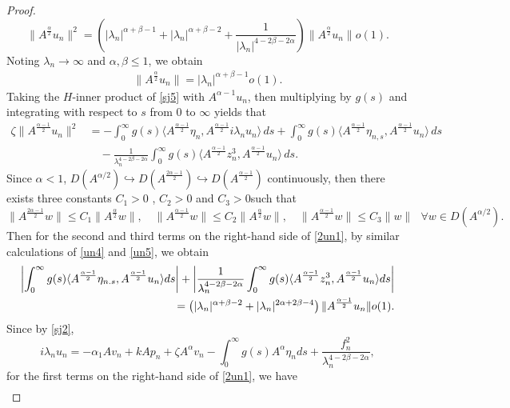 \documentclass[10pt,a4paper]{amsart}
\begin{document}
\begin{proof}
\[\|A^{\frac{\alpha}{2}}u_n\|^2=\left( |\lambda_n|^{\alpha + \beta - 1} +|\lambda_n|^{\alpha+\beta-2} +\frac{1}{|\lambda_n|^{4-2\beta-2\alpha}}\right)\| A^{\frac{\alpha}{2}} u_n \| o(1).\]
Noting $\lambda_n\to\infty$ and $\alpha,\beta\le1$, we obtain
		\begin{align}\label{un6}
			\| A^{\frac{\alpha}{2}} u_n \| = |\lambda_n|^{\alpha + \beta - 1} o(1).
		\end{align}
	Taking the $H$-inner product of \eqref{sj5} with $A^{\alpha-1}u_n$, then multiplying by $g(s)$ and integrating with respect to $s$ from $0$ to $\infty$ yields that
		\begin{align}\label{2un1}
			\zeta \| A^{\frac{\alpha-1}{2}} u_n \|^2
			&= -\int_0^\infty  g(s) \langle A^{\frac{\alpha-1}{2}} \eta_n, A^{\frac{\alpha-1}{2}}i \lambda_n u_n \rangle \, ds
			+ \int_0^\infty g(s) \langle A^{\frac{\alpha-1}{2}} \eta_{n,s}, A^{\frac{\alpha-1}{2}} u_n \rangle \, ds \nonumber \\
			&\quad - \frac{1}{\lambda_n^{4-2\beta-2\alpha}} \int_0^\infty g(s) \langle A^{\frac{\alpha-1}{2}} z_n^3, A^{\frac{\alpha-1}{2}} u_n \rangle \, ds.
		\end{align}
Since $\alpha<1$, $ D(A^{{\alpha}/{2}})\hookrightarrow D(A^{\frac{2\alpha-1}{2}})\hookrightarrow D(A^{\frac{\alpha-1}{2}})$ continuously, then there exists three  constants \( C_1 >0\) , \( C_2>0 \)  and $C_3>0$such that
		\[\|A^{\frac{2\alpha-1}{2}}w\| \le C_1\|A^{\frac{\alpha}{2}}w\|,\quad
		\|A^{\frac{\alpha-1}{2}}w\| \le C_2\|A^{\frac{\alpha}{2}}w\|,\quad
		\|A^{\frac{\alpha-1}{2}}w\| \le C_3\|w\|~~~\forall w\in D(A^{{\alpha}/{2}}).\]
		Then for the second and third terms on the right-hand side of \eqref{2un1}, by similar calculations of \eqref{un4} and \eqref{un5}, we obtain
		\begin{align}\label{2un2}
			\left|\int_0^\infty g(s)\langle A^{\frac{\alpha-1}{2}}\eta_{n.s}, A^{\frac{\alpha-1}{2}}u_n\rangle ds\right| +\left| \frac{1}{\lambda_n^{4-2\beta-2\alpha}}\int_0^\infty g(s)\langle A^{\frac{\alpha-1}{2}}z_n^3, A^{\frac{\alpha-1}{2}}u_n\rangle ds\right|\notag\\
=\left(|\lambda_n|^{\alpha +\beta -2}+|\lambda_n|^{2\alpha +2\beta -4}\right)\|A^{\frac{\alpha-1}{2}}u_n\|o(1).
		\end{align}
Since by \eqref{sj2},
		\[i\lambda_n u_n = -\alpha_1 A v_n + k A p_n + \zeta A^\alpha v_n - \int_0^\infty g(s) A^\alpha \eta_n ds + \frac{f_n^2}{\lambda_n^{4-2\beta-2\alpha}},\]
for the first terms on the right-hand side of \eqref{2un1}, we have
		\begin{align*}

\end{align*}
\end{proof}
\end{document}

